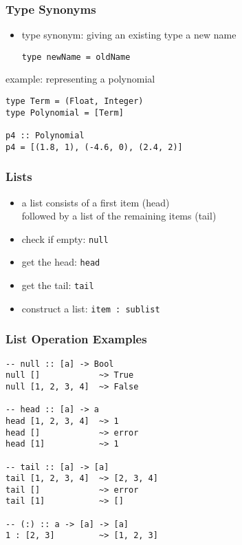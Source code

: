 \documentclass[dvipsnames]{beamer}
\theoremstyle{plain}
\begin{document}
\begin{frame}[fragile]
  \frametitle{Type Synonyms}

  \begin{itemize}
    \item type synonym: giving an existing type a new name
    \smallskip
    \begin{lstlisting}
type newName = oldName
    \end{lstlisting}
  \end{itemize}

  \pause
  \begin{exampleblock}{example: representing a polynomial}
    \begin{lstlisting}
type Term = (Float, Integer)
type Polynomial = [Term]

p4 :: Polynomial
p4 = [(1.8, 1), (-4.6, 0), (2.4, 2)]
    \end{lstlisting}
  \end{exampleblock}
\end{frame}

\begin{frame}
  \frametitle{Lists}

  \begin{itemize}
    \item a list consists of a first item (\alert{head})\\
      followed by a list of the remaining items (\alert{tail})

    \medskip
    \item check if empty: \lstinline|null|
    \item get the head: \lstinline|head|
    \item get the tail: \lstinline|tail|
    \item construct a list: \lstinline|item : sublist|
  \end{itemize}
\end{frame}

\begin{frame}[fragile]
  \frametitle{List Operation Examples}

  \begin{lstlisting}
-- null :: [a] -> Bool
null []            ~> True
null [1, 2, 3, 4]  ~> False

-- head :: [a] -> a
head [1, 2, 3, 4]  ~> 1
head []            ~> error
head [1]           ~> 1

-- tail :: [a] -> [a]
tail [1, 2, 3, 4]  ~> [2, 3, 4]
tail []            ~> error
tail [1]           ~> []

-- (:) :: a -> [a] -> [a]
1 : [2, 3]         ~> [1, 2, 3]
  \end{lstlisting}
\end{frame}
\end{document}

